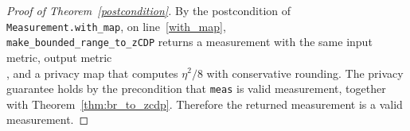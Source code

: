 \documentclass{article}
\begin{document}
\begin{proof}[Proof of Theorem~\ref{postcondition}]
    By the postcondition of \texttt{Measurement.with\_map}, on line~\ref{with_map}, \\
    \texttt{make\_bounded\_range\_to\_zCDP} returns a measurement with the same input metric, 
    output metric \\, 
    and a privacy map that computes $\eta^2 / 8$ with conservative rounding.
    The privacy guarantee holds by the precondition that \texttt{meas} is valid measurement,
    together with Theorem~\ref{thm:br_to_zcdp}.
    Therefore the returned measurement is a valid measurement.
\end{proof}



\end{document}
